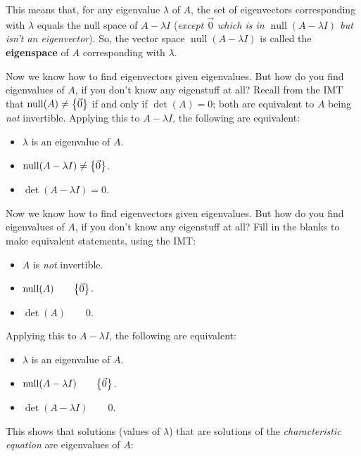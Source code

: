 \documentclass[11pt, letterpaper]{report}
\newenvironment{notes}{}{}
\newenvironment{book}{}{}
\let\originalleft\left
\let\originalright\right
\renewcommand{\left}{\mathopen{}\mathclose\bgroup\originalleft}
\renewcommand{\right}{\aftergroup\egroup\originalright}
\DeclareMathOperator{\nul}{null}
\begin{document}
This means that, for any eigenvalue $\lambda$ of $A$, the set of eigenvectors corresponding with $\lambda$ equals the null space of $A-\lambda I$ (\emph{except $\vec{0}$ which is in $\nul ( A-\lambda I )$ but isn't an eigenvector}). So, the vector space $\nul ( A-\lambda I )$ is called the \textbf{eigenspace} of $A$ corresponding with $\lambda$.

\begin{book}
Now we know how to find eigenvectors given eigenvalues. But how do you find eigenvalues of $A$, if you don't know any eigenstuff at all? Recall from the IMT that $\nul(A) \ne \left\{ \vec{0} \right\}$ if and only if $\det (A) = 0$; both are equivalent to $A$ being \emph{not} invertible. Applying this to $A-\lambda I$, the following are equivalent:
\begin{itemize}
\item $\lambda$ is an eigenvalue of $A$.
\item $\nul ( A-\lambda I )\ne \left\{ \vec{0} \right\}$.
\item $\det ( A-\lambda I ) = 0$.
\end{itemize}
\end{book}

\begin{notes}
Now we know how to find eigenvectors given eigenvalues. But how do you find eigenvalues of $A$, if you don't know any eigenstuff at all? Fill in the blanks to make equivalent statements, using the IMT:
\begin{itemize}
\item $A$ is \emph{not} invertible.
\item $\nul(A) \quad \quad \left\{ \vec{0} \right\}$.
\item $\det(A) \quad \quad 0$.
\end{itemize}
 Applying this to $A-\lambda I$, the following are equivalent:
\begin{itemize}
\item $\lambda$ is an eigenvalue of $A$.
\item $\nul ( A-\lambda I ) \quad \quad \left\{ \vec{0} \right\}$.
\item $\det ( A-\lambda I ) \quad \quad 0$.
\end{itemize}
\end{notes}

This shows that solutions (values of $\lambda$) that are solutions of the \emph{characteristic equation} are eigenvalues of $A$:
\end{document}
